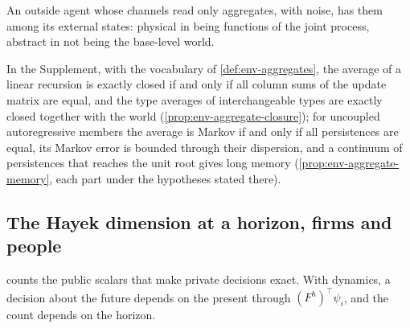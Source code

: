 An outside agent whose channels read only aggregates, with noise, has them among its external states: physical in being functions of the joint process, abstract in not being the base-level world.

In the Supplement, with the vocabulary of \cref{def:env-aggregates}, the average of a linear recursion is exactly closed if and only if all column sums of the update matrix are equal, and the type averages of interchangeable types are exactly closed together with the world (\cref{prop:env-aggregate-closure}); for uncoupled autoregressive members the average is Markov if and only if all persistences are equal, its Markov error is bounded through their dispersion, and a continuum of persistences that reaches the unit root gives long memory (\cref{prop:env-aggregate-memory}, each part under the hypotheses stated there).

\subsection{The Hayek dimension at a horizon, firms and people}\label{sec:env-hayek}

 counts the public scalars that make private decisions exact. With dynamics, a decision about the future depends on the present through $(F^h)^\top\psi_i$, and the count depends on the horizon.

